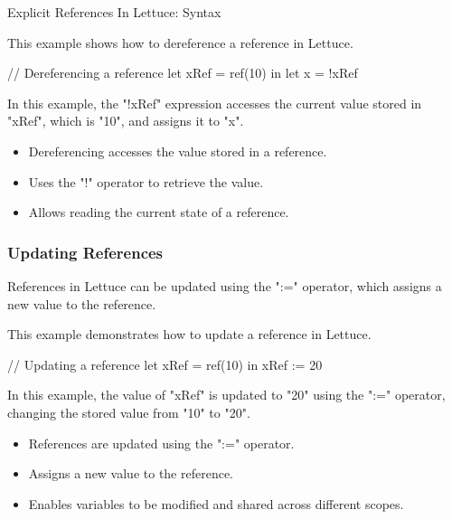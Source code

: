 \begin{notes}{Explicit References In Lettuce: Syntax}
    \begin{highlight}[Dereferencing]
    
        This example shows how to dereference a reference in Lettuce.
    
    \begin{code}[Lettuce]
    // Dereferencing a reference
    let xRef = ref(10) in
    let x = !xRef
    \end{code}
    
        In this example, the "!xRef" expression accesses the current value stored in "xRef", which is "10", and assigns it to "x".
    
        \begin{itemize}
            \item Dereferencing accesses the value stored in a reference.
            \item Uses the "!" operator to retrieve the value.
            \item Allows reading the current state of a reference.
        \end{itemize}
    
    \end{highlight}
    
    \subsubsection*{Updating References}
    
    References in Lettuce can be updated using the ":=" operator, which assigns a new value to the reference.
    
    \begin{highlight}
    
        This example demonstrates how to update a reference in Lettuce.
    
    \begin{code}[Lettuce]
    // Updating a reference
    let xRef = ref(10) in
    xRef := 20
    \end{code}
    
        In this example, the value of "xRef" is updated to "20" using the ":=" operator, changing the stored value from "10" to "20".
    
        \begin{itemize}
            \item References are updated using the ":=" operator.
            \item Assigns a new value to the reference.
            \item Enables variables to be modified and shared across different scopes.
        \end{itemize}
    

\end{highlight}
\end{notes}
